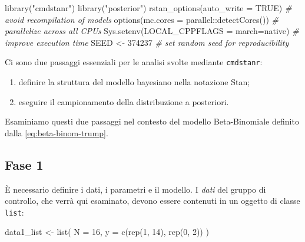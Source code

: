 \documentclass[
  10pt,
  italian,
  a4paper,
  extrafontsizes,onecolumn,openright
  ]{memoir}
\newenvironment{Shaded}{}{}
\newcommand{\AttributeTok}[1]{\textcolor[rgb]{0.49,0.56,0.16}{#1}}
\newcommand{\CommentTok}[1]{\textcolor[rgb]{0.38,0.63,0.69}{\textit{#1}}}
\newcommand{\ConstantTok}[1]{\textcolor[rgb]{0.53,0.00,0.00}{#1}}
\newcommand{\DecValTok}[1]{\textcolor[rgb]{0.25,0.63,0.44}{#1}}
\newcommand{\FunctionTok}[1]{\textcolor[rgb]{0.02,0.16,0.49}{#1}}
\newcommand{\NormalTok}[1]{#1}
\newcommand{\OtherTok}[1]{\textcolor[rgb]{0.00,0.44,0.13}{#1}}
\newcommand{\SpecialCharTok}[1]{\textcolor[rgb]{0.25,0.44,0.63}{#1}}
\newcommand{\StringTok}[1]{\textcolor[rgb]{0.25,0.44,0.63}{#1}}
\providecommand{\tightlist}{%
  \setlength{\itemsep}{0pt}\setlength{\parskip}{0pt}}
\begin{document}
\begin{Shaded}
\begin{Highlighting}[]
\FunctionTok{library}\NormalTok{(}\StringTok{"cmdstanr"}\NormalTok{)}
\FunctionTok{library}\NormalTok{(}\StringTok{"posterior"}\NormalTok{)}
\FunctionTok{rstan\_options}\NormalTok{(}\AttributeTok{auto\_write =} \ConstantTok{TRUE}\NormalTok{) }\CommentTok{\# avoid recompilation of models}
\FunctionTok{options}\NormalTok{(}\AttributeTok{mc.cores =}\NormalTok{ parallel}\SpecialCharTok{::}\FunctionTok{detectCores}\NormalTok{()) }\CommentTok{\# parallelize across all CPUs}
\FunctionTok{Sys.setenv}\NormalTok{(}\AttributeTok{LOCAL\_CPPFLAGS =} \StringTok{\textquotesingle{}{-}march=native\textquotesingle{}}\NormalTok{) }\CommentTok{\# improve execution time}
\NormalTok{SEED }\OtherTok{\textless{}{-}} \DecValTok{374237} \CommentTok{\# set random seed for reproducibility}
\end{Highlighting}
\end{Shaded}

Ci sono due passaggi essenziali per le analisi svolte mediante \texttt{cmdstanr}:

\begin{enumerate}
\def\labelenumi{\arabic{enumi}.}
\tightlist
\item
  definire la struttura del modello bayesiano nella notazione Stan;
\item
  eseguire il campionamento della distribuzione a posteriori.
\end{enumerate}

Esaminiamo questi due passaggi nel contesto del modello Beta-Binomiale definito dalla \eqref{eq:beta-binom-trump}.

\hypertarget{fase-1}{%
\subsection{Fase 1}\label{fase-1}}

È necessario definire i dati, i parametri e il modello. I \emph{dati} del gruppo di controllo, che verrà qui esaminato, devono essere contenuti in un oggetto di classe \texttt{list}:

\begin{Shaded}
\begin{Highlighting}[]
\NormalTok{data1\_list }\OtherTok{\textless{}{-}} \FunctionTok{list}\NormalTok{(}
  \AttributeTok{N =} \DecValTok{16}\NormalTok{,}
  \AttributeTok{y =} \FunctionTok{c}\NormalTok{(}\FunctionTok{rep}\NormalTok{(}\DecValTok{1}\NormalTok{, }\DecValTok{14}\NormalTok{), }\FunctionTok{rep}\NormalTok{(}\DecValTok{0}\NormalTok{, }\DecValTok{2}\NormalTok{))}
\NormalTok{)}
\end{Highlighting}
\end{Shaded}
\end{document}
